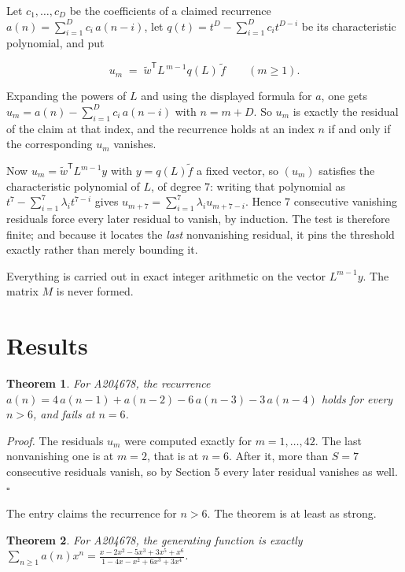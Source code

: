 \documentclass[11pt]{article}
\newtheorem{theorem}{Theorem}
\theoremstyle{definition}
\begin{document}
Let $c_1,\dots,c_D$ be the coefficients of a claimed recurrence $a(n) = \sum_{i=1}^{D} c_i\,a(n-i)$, let $q(t) = t^{D} - \sum_{i=1}^{D} c_i t^{D-i}$ be its characteristic polynomial, and put

\[u_m \;=\; \tilde w^{\mathsf T} L^{\,m-1} q(L)\,\tilde f \qquad (m \ge 1).\]

Expanding the powers of $L$ and using the displayed formula for $a$, one gets $u_m = a(n) - \sum_{i=1}^{D} c_i\,a(n-i)$ with $n = m + D$. So $u_m$ is exactly the residual of the claim at that index, and the recurrence holds at an index $n$ if and only if the corresponding $u_m$ vanishes.

Now $u_m = \tilde w^{\mathsf T} L^{m-1} y$ with $y = q(L)\tilde f$ a fixed vector, so $(u_m)$ satisfies the characteristic polynomial of $L$, of degree $7$: writing that polynomial as $t^{7} - \sum_{i=1}^{7} \lambda_i t^{7-i}$ gives $u_{m+7} = \sum_{i=1}^{7} \lambda_i u_{m+7-i}$. Hence $7$ consecutive vanishing residuals force every later residual to vanish, by induction. The test is therefore finite; and because it locates the {\itshape last} nonvanishing residual, it pins the threshold exactly rather than merely bounding it.

Everything is carried out in exact integer arithmetic on the vector $L^{m-1}y$. The matrix $M$ is never formed.

\section{Results}

\begin{theorem} For A204678, the recurrence $a(n) = 4\,a(n-1) + a(n-2) - 6\,a(n-3) - 3\,a(n-4)$ holds for every $n > 6$, and fails at $n = 6$.\end{theorem}

{\itshape Proof.} The residuals $u_m$ were computed exactly for $m = 1,\dots,42$. The last nonvanishing one is at $m = 2$, that is at $n = 6$. After it, more than $S = 7$ consecutive residuals vanish, so by Section 5 every later residual vanishes as well. $\square$

The entry claims the recurrence for $n > 6$. The theorem is at least as strong.

\begin{theorem} For A204678, the generating function is exactly $\sum_{n\ge 1} a(n)x^n = \frac{x - 2x^{2} - 5x^{3} + 3x^{5} + x^{6}}{1 - 4x - x^{2} + 6x^{3} + 3x^{4}}$.\end{theorem}
\end{document}
